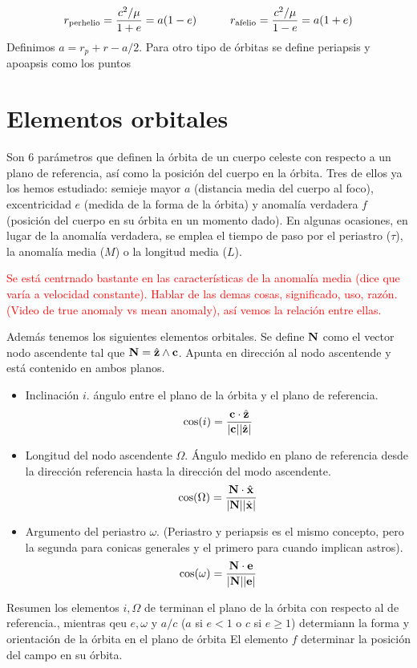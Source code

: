\begin{equation}
    r_{\text{perhelio}} = \frac{c^2/\mu}{1+e} = a(1-e) \quad \quad \quad r_{\text{afelio}} = \frac{c^2/\mu}{1-e} = a(1+e)
\end{equation}
Definimos $a=r_p+r-a/2$. Para otro tipo de órbitas se define periapsis y apoapsis como los puntos 

\section{Elementos orbitales}

Son 6 parámetros que definen la órbita de un cuerpo celeste con respecto a un plano de referencia, así como la posición del cuerpo en la órbita. Tres de ellos ya los hemos estudiado: semieje mayor $a$ (distancia media del cuerpo al foco), excentricidad $e$ (medida de la forma de la órbita) y anomalía verdadera $f$ (posición del cuerpo en su órbita en un momento dado). En algunas ocasiones, en lugar de la anomalía verdadera, se emplea el tiempo de paso por el periastro ($\tau$), la anomalía media ($M$) o la longitud media ($L$).

\begin{Anotacion}
    \textcolor{red}{ Se está centrnado bastante en las características de la anomalía media (dice que varía a velocidad constante). Hablar de las demas cosas, significado, uso, razón. (Video de true anomaly vs mean anomaly), así vemos la relación entre ellas. }
\end{Anotacion}

Además tenemos los siguientes elementos orbitales. Se define $\mathbf{N}$ como el vector nodo ascendente tal que $\mathbf{N}=\hat{\mathbf{z}} \wedge \mathbf{c}$. Apunta en dirección al nodo ascentende y está contenido en ambos planos. 

\begin{itemize}
    \item Inclinación $i$. ángulo entre el plano de la órbita y el plano de referencia.
    \begin{equation}
        \cos (i) = \frac{\mathbf{c} \cdot \hat{\mathbf{z}}}{|\mathbf{c}||\hat{\mathbf{z}}|}
    \end{equation}
    \item Longitud del nodo ascendente $\Omega$. Ángulo medido en plano de referencia desde la dirección referencia hasta la dirección del modo ascendente.
    \begin{equation}
        \cos (\Omega) = \frac{\mathbf{N} \cdot \hat{\mathbf{x}}}{|\mathbf{N}||\hat{\mathbf{x}}|}
    \end{equation}
    \item Argumento del periastro $\omega$. (Periastro y periapsis es el mismo concepto, pero la segunda para conicas generales y el primero para cuando implican astros). 
    \begin{equation}
        \cos (\omega) = \frac{\mathbf{N}\cdot \mathbf{e}}{|\mathbf{N}||\mathbf{e}|}
    \end{equation}
\end{itemize}
Resumen los elementos $i,\Omega$ de terminan el plano de la órbita con respecto al de referencia., mientras qeu $e,\omega$ y $a/c$ ($a$ si $e<1$ o $c$ si $e\geq1$) determiann la forma y orientación de la órbita en el plano de órbita  El elemento $f$ determinar la posición del campo en su órbita.

